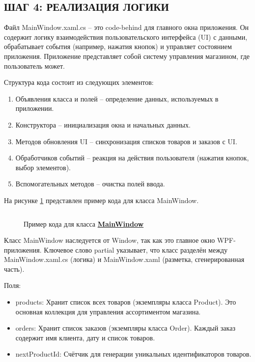 \documentclass[12pt]{article}
\newcommand{\colorGIT}[1]{\textbf{#1}}
\renewcommand{\texttt}[1]{{\small\ttfamily #1}}
\numberwithin{listing}{section}
\numberwithin{figure}{section}
\begin{document}
\newpage

\subsection{ШАГ 4: РЕАЛИЗАЦИЯ ЛОГИКИ}

Файл \texttt{MainWindow.xaml.cs} -- это \texttt{code-behind} для главного окна приложения. Он содержит логику взаимодействия пользовательского интерфейса (\texttt{UI}) с данными, обрабатывает события (например, нажатия кнопок) и управляет состоянием приложения. Приложение представляет собой систему управления магазином, где пользователь может.

Структура кода состоит из следующих элементов:
\begin{enumerate}
	\item Объявления класса и полей -- определение данных, используемых в приложении.
	\item Конструктора -- инициализация окна и начальных данных.
	\item Методов обновления \texttt{UI} -- синхронизация списков товаров и заказов с \texttt{UI}.
	\item Обработчиков событий -- реакция на действия пользователя (нажатия кнопок, выбор элементов).
	\item Вспомогательных методов -- очистка полей ввода.
\end{enumerate}
На рисунке \ref{fig:Main} представлен пример кода для класса \texttt{MainWindow}.

\begin{figure}[H]
	\centering
	\inputminted[firstline=1, lastline=21]{csharp}{../../3lab/StoreManager/MainWindow.xaml.cs}
	\caption{Пример кода для класса \colorGIT{\href{https://github.com/WebMasterIT/Csharp_Labs/blob=ec375afd16c0647b337cf3d8a79c8bef904fc1be/3lab/StoreManager/MainWindow.xaml.cs\#L1-L21}{MainWindow}}}
	\label{fig:Main}
\end{figure}

Класс \texttt{MainWindow} наследуется от \texttt{Window}, так как это главное окно \texttt{WPF}-приложения. Ключевое слово \texttt{partial} указывает, что класс разделён между \texttt{MainWindow.xaml.cs} (логика) и \texttt{MainWindow\-.xaml} (разметка, сгенерированная часть).

\noindent Поля:
\begin{itemize}
	\item \texttt{products}: Хранит список всех товаров (экземпляры класса \texttt{Product}). Это основная коллекция для управления ассортиментом магазина.
	\item \texttt{orders}: Хранит список заказов (экземпляры класса \texttt{Order}). Каждый заказ содержит имя клиента, дату и список товаров.
	\item \texttt{nextProductId}: Счётчик для генерации уникальных идентификаторов товаров.
\end{itemize}
\end{document}
